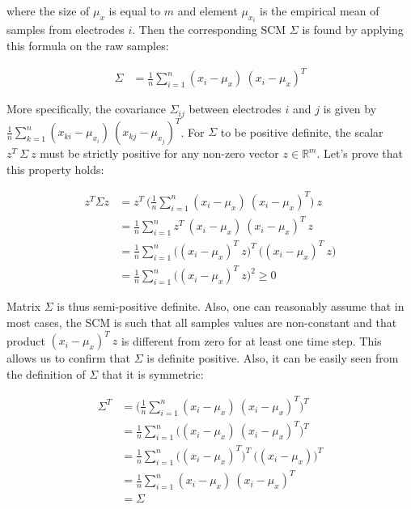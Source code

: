 \documentclass[a4paper,11pt]{report}
\begin{document}
\noindent where the size of $\mu_x$ is equal to $m$ and element
$\mu_{x_i}$ is the empirical mean of samples from electrodes $i$.
Then the corresponding SCM $\Sigma$ is found by applying this formula on the raw samples:

\begin{align}
  \Sigma & = \frac{1}{n} \sum\limits_{i=1}^{n} (x_i - \mu_x) \ (x_i - \mu_x)^T
\end{align}

\noindent More specifically, the covariance $\Sigma_{ij}$ between electrodes $i$ and $j$
is given by $\frac{1}{n} \sum\limits_{k=1}^{n} (x_{ki} - \mu_{x_i}) \ (x_{kj} - \mu_{x_j})^T$.
For $\Sigma$ to be positive definite, the scalar $z^T \ \Sigma \ z$ must be strictly positive
for any non-zero vector $z \in \mathbb{R}^m$. Let's prove that this property holds:

\begin{align}
  z^T \Sigma z & = z^T \ \Big( \frac{1}{n} \sum\limits_{i=1}^{n} (x_i - \mu_x) \ (x_i - \mu_x)^T \Big) \ z \\
  & = \frac{1}{n} \sum\limits_{i=1}^{n} z^T \ (x_i - \mu_x) \ (x_i - \mu_x)^T \ z \\
  & = \frac{1}{n} \sum\limits_{i=1}^{n} \Big( (x_i - \mu_x)^T \ z \Big)^T \ \Big( (x_i - \mu_x)^T \ z \Big) \\
  & = \frac{1}{n} \sum\limits_{i=1}^{n} \Big( (x_i - \mu_x)^T \ z \Big)^2 \ge 0
\end{align}

Matrix $\Sigma$ is thus semi-positive definite. Also, one can reasonably assume that in most cases,
the SCM is such that all samples values are non-constant and that product $(x_i - \mu_x)^T \ z$
is different from zero for at least one time step. This allows us to confirm that $\Sigma$ is definite
positive. Also, it can be easily seen from the definition of $\Sigma$ that it is symmetric:

\begin{align}
  \Sigma^T & = \Big( \frac{1}{n} \sum\limits_{i=1}^{n} (x_i - \mu_x) \ (x_i - \mu_x)^T \Big)^T \\
  & = \frac{1}{n} \sum\limits_{i=1}^{n} \Big( (x_i - \mu_x) \ (x_i - \mu_x)^T \Big)^T \\
  & = \frac{1}{n} \sum\limits_{i=1}^{n} \Big( (x_i - \mu_x)^T \Big)^T \ \Big( (x_i - \mu_x) \Big)^T \\
  & = \frac{1}{n} \sum\limits_{i=1}^{n} (x_i - \mu_x) \ (x_i - \mu_x)^T \\
  & = \Sigma
\end{align}
\end{document}
